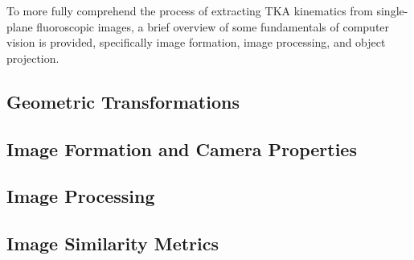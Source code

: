 To more fully comprehend the process of extracting TKA kinematics from single-plane fluoroscopic images, a brief overview of some fundamentals of computer vision is provided, specifically image formation, image processing, and object projection.

\subsection{Geometric Transformations}
\label{sec:geometric-transformations}


\subsection{Image Formation and Camera Properties}
\label{sec:img-form-camera-props}


\subsection{Image Processing}
\label{sec:image-processing}


\subsection{Image Similarity Metrics}
\label{sec:image-similarity}

